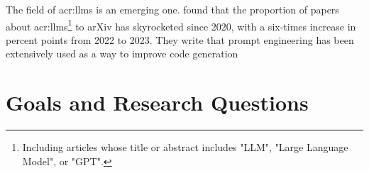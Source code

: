 \begin{comment}
Having a template to work from provides a starting point.
However, for a given project, a slight variation in the template may be required due to the nature of the given project.
Furthermore, the order in which the various chapters and sections will be written will also vary from project to project,
but the writing will seldom start at the abstract and sequentially follow the chapters of the report.
One critical reason for this is that you need to start writing as early as possible and that you will begin to write up where you are currently focusing.
However, do not leave working on the abstract until the very last days. The abstract is the first thing anyone reads of an article or thesis --- after the title;
and thus it is important that it is very well written. Abstracts are hard to write, so create revisions throughout the course of your project.

The background and motivation here should state where your project is situated in the field and what the key driving forces motivating this research are.
However, keep this section brief, as it is still part of the introduction.
The motivation will be further elaborated on in Chapter~\ref{cha:related_work}, presenting your complete state-of-the-art.

Note that this template uses italics to highlight where Latin wording is inserted to represent text and the text of the template
that we wish to draw your attention to. The italics themselves are not an indication that such sections should use italics.
\end{comment}

The field of \glspl{acr:llm} is an emerging one. \cite[2]{fanLargeLanguageModels2023} found that the proportion of papers about \glspl{acr:llm}\footnote{Including articles whose title or abstract includes "LLM", "Large Language Model", or "GPT".} to arXiv has skyrocketed since 2020, with a six-times increase in percent points from 2022 to 2023. They write that prompt engineering has been extensively used as a way to improve code generation \citep[7]{fanLargeLanguageModels2023}

\section{Goals and Research Questions}\label{sec:goals-and-research-questions}
\label{sec:GoalsandResearchQuestions}

